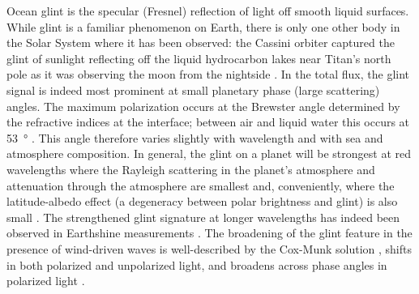 \documentclass[
    usenatbib,
]{mnras}
\begin{document}
Ocean glint is the specular (Fresnel) reflection of light off smooth liquid surfaces. While glint is a familiar phenomenon on Earth, there is only
one other body in the Solar System where it has been observed: 
the Cassini orbiter captured the glint of sunlight reflecting off the
liquid hydrocarbon lakes near Titan's north pole as it was observing
the moon from the nightside \citep{2010GeoRL..37.7104S}.
%
In the total flux, the glint signal is indeed most prominent at small planetary phase (large scattering) angles.
%
The maximum polarization occurs at the Brewster angle determined by the refractive indices at the interface; between air and liquid water this occurs at \qty{53}{\degree} \citep[i.e., a phase angle of \qty{127}{\degree}; see, e.g.,][]{2008Icar..195..927W}.
%
This angle therefore varies slightly with wavelength and with sea and atmosphere composition.
%
In general, the glint on a planet will be strongest at red wavelengths where the Rayleigh scattering in the planet's atmosphere and attenuation through the atmosphere are smallest \citep{Zugger_2011} and, conveniently, where the latitude-albedo effect (a degeneracy between polar brightness and glint) is also small \citep{2012ApJ...752L...3C}.
%
The strengthened glint signature at longer wavelengths has indeed been observed in Earthshine measurements \citep{Emde2017,sterzik2019, takahashi2021}.
%
{\color{red}{check the next sentence:}}
The broadening of the glint feature in the presence of wind-driven waves is well-described by the Cox-Munk solution \citep{CoxMunk1954}, shifts in both polarized and unpolarized light, and broadens across phase angles in polarized light \citep{kopparla2018, Zugger_2010, treesandstam2019, trees2022}. 
\end{document}
